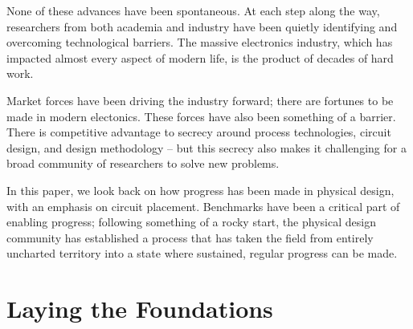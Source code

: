 \documentclass[sigconf]{acmart}
\begin{document}
None of these advances have been spontaneous.  At each
step along the way, researchers from both academia and
industry have been quietly identifying and overcoming
technological barriers.  The massive electronics industry,
which has impacted almost every aspect of modern life,
is the product of decades of hard work.

Market forces have been driving the industry forward; there are
fortunes to be made in modern electonics.  These forces have also been
something of a barrier.  There is competitive advantage to secrecy
around process technologies, circuit design, and design methodology --
but this secrecy also makes it challenging for a broad community of
researchers to solve new problems.


In this paper, we look back on how progress has been made
in physical design, with an emphasis on circuit placement.
Benchmarks have been a critical part of enabling progress;
following something of a rocky start, the physical design
community has established a process that has taken the field
from entirely uncharted territory into a state where sustained,
regular progress can be made.


\iffalse
{\bf How to say this?
  Economic driver pushing technology forward.  Lots of
  companies competing for market share.  Secrecy on
  design technology, circuit designs, gives a competitive
  advantage -- but also limits the number of people who
  can solve the problems that need to be solved.

  For academic researchers in particular to be helpful,
  details of the problems needing solving have to be
  available.  Without test cases, and things that are
  suitable for publication, they cannot assist.
}




Making progress in design automation has been challenging;
the problems addressed are fundamentally hard from a scientific
perspective. Complicating matters further are the financial
implications -- semiconductor manufacturers, design tool companies,
and circuit designers, are all interested in making profits, and
this depends on some degree of secrecy in their work.  At the
same time, solving design problems requires assistance from
others.
\fi


\section{Laying the Foundations}
\end{document}
